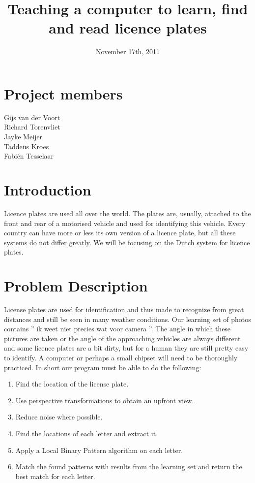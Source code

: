\documentclass[a4paper]{article}
\title{Teaching a computer to learn, find and read licence plates}
\date{November 17th, 2011}
\begin{document}
\maketitle

\section*{Project members}
Gijs van der Voort\\Richard Torenvliet\\Jayke Meijer\\Tadde\"us Kroes\\Fabi\'en Tesselaar

\tableofcontents
\setcounter{secnumdepth}{1}

\section{Introduction}

Licence plates are used all over the world. The plates are, usually, attached to the front and rear
of a motorised vehicle and used for identifying this vehicle. Every
country can have more or less its own version of a licence plate, but all these systems do not 
differ greatly. We will be focusing on the Dutch system for licence plates.

\section{Problem Description}

License plates are used for identification and thus made to recognize from great
distances and still be seen in many weather conditions. Our learning set of photos contains
'' ik weet niet precies wat voor camera ''. The angle in which these pictures are taken or the angle 
of the approaching vehicles are always different and some licence plates are a bit dirty,
but for a human they are still pretty easy to identify. A computer or perhaps a small
chipset will need to be thoroughly practiced. In short our program must be able to
do the following:

\begin{enumerate}
\item Find the location of the license plate.
\item Use perspective transformations to obtain an upfront view.
\item Reduce noise where possible.
\item Find the locations of each letter and extract it.
\item Apply a Local Binary Pattern algorithm on each letter.
\item Match the found patterns with results from the learning set and return the best match for each letter.
\end{enumerate}
\end{document}
